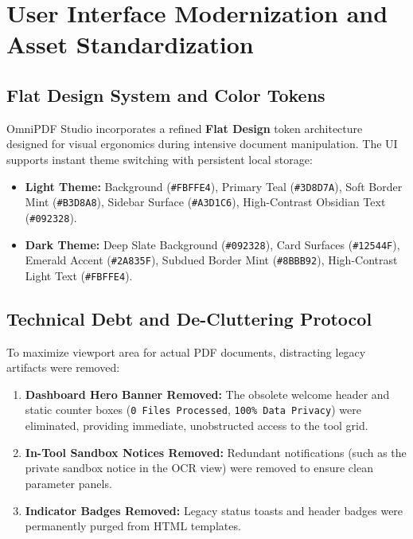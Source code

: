 \documentclass[11pt,a4paper]{article}
\begin{document}
\section{User Interface Modernization and Asset Standardization}
\label{sec:ui_assets}

\subsection{Flat Design System and Color Tokens}
OmniPDF Studio incorporates a refined \textbf{Flat Design} token architecture designed for visual ergonomics during intensive document manipulation. The UI supports instant theme switching with persistent local storage:
\begin{itemize}
    \item \textbf{Light Theme:} Background (\texttt{\#FBFFE4}), Primary Teal (\texttt{\#3D8D7A}), Soft Border Mint (\texttt{\#B3D8A8}), Sidebar Surface (\texttt{\#A3D1C6}), High-Contrast Obsidian Text (\texttt{\#092328}).
    \item \textbf{Dark Theme:} Deep Slate Background (\texttt{\#092328}), Card Surfaces (\texttt{\#12544F}), Emerald Accent (\texttt{\#2A835F}), Subdued Border Mint (\texttt{\#8BBB92}), High-Contrast Light Text (\texttt{\#FBFFE4}).
\end{itemize}

\subsection{Technical Debt and De-Cluttering Protocol}
To maximize viewport area for actual PDF documents, distracting legacy artifacts were removed:
\begin{enumerate}
    \item \textbf{Dashboard Hero Banner Removed:} The obsolete welcome header and static counter boxes (\texttt{0 Files Processed}, \texttt{100\% Data Privacy}) were eliminated, providing immediate, unobstructed access to the tool grid.
    \item \textbf{In-Tool Sandbox Notices Removed:} Redundant notifications (such as the private sandbox notice in the OCR view) were removed to ensure clean parameter panels.
    \item \textbf{Indicator Badges Removed:} Legacy status toasts and header badges were permanently purged from HTML templates.
\end{enumerate}
\end{document}

